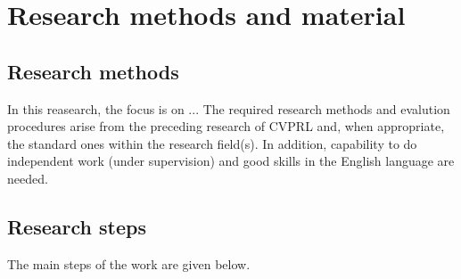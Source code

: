 \documentclass[11pt,a4,notitlepage]{article}
\begin{document}
\section{Research methods and material}

\subsection{Research methods}

In this reasearch, the focus is on ...  The required research methods and
evalution procedures arise from the preceding research of \ac{CVPRL} and, when
appropriate, the standard ones within the research field(s). In addition,
capability to do independent work (under supervision) and good skills in the
English language are needed.

\subsection{Research steps}

The main steps of the work are given below.
\end{document}
